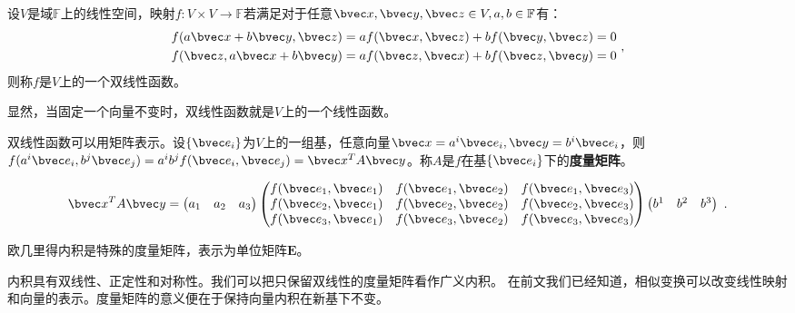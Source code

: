 

\begin{definition}{}
设$V$是域$\mathbb F$上的线性空间，映射$f:V\times V\rightarrow\mathbb F$若满足对于任意$\bvec x,\bvec y,\bvec z \in V,a,b\in \mathbb F$有：
\begin{equation}
\begin{aligned}
f(a\bvec x+b\bvec y,\bvec z)&=af(\bvec x,\bvec z)+bf(\bvec y,\bvec z)=0\\
f(\bvec z,a\bvec x+b\bvec y)&=af(\bvec z,\bvec  x)+bf(\bvec z,\bvec y)=0
\end{aligned}~,
\end{equation}
则称$f$是$V$上的一个双线性函数。
\end{definition}

显然，当固定一个向量不变时，双线性函数就是$V$上的一个线性函数。

双线性函数可以用矩阵表示。设$\{\bvec e_i\}$为$V$上的一组基，任意向量$\bvec x=a^i\bvec e_i,\bvec y=b^i\bvec e_i$，则$f(a^i\bvec e_i,b^j\bvec e_j)=a^ib^jf(\bvec e_i,\bvec e_j)=\bvec x^TA\bvec y$。称$A$是$f$在基$\{\bvec e_i\}$下的\textbf{度量矩阵}。
\begin{example}{}
\begin{equation}
\bvec x^TA\bvec y=\begin{pmatrix}
 a_1 &a_2  &a_3
\end{pmatrix}
\begin{pmatrix}
  f(\bvec e_1,\bvec e_1)& f(\bvec e_1,\bvec e_2) &f(\bvec e_1,\bvec e_3) \\
 f(\bvec e_2,\bvec e_1) &f(\bvec e_2,\bvec e_2)  &f(\bvec e_2,\bvec e_3) \\
 f(\bvec e_3,\bvec e_1) & f(\bvec e_3,\bvec e_2) &f(\bvec e_3,\bvec e_3)
\end{pmatrix}
 \begin{pmatrix}
 b^1 &b^2  &b^3
\end{pmatrix}~.
\end{equation}
\end{example}
\begin{example}{}
欧几里得内积是特殊的度量矩阵，表示为单位矩阵$\boldsymbol E$。
\end{example}
内积具有双线性、正定性和对称性。我们可以把只保留双线性的度量矩阵看作广义内积。
在前文我们已经知道，相似变换可以改变线性映射和向量的表示。度量矩阵的意义便在于保持向量内积在新基下不变。

